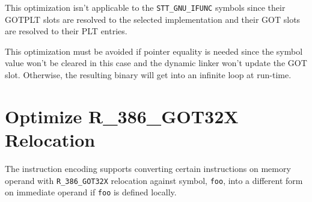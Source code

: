 This optimization isn't applicable to the \texttt{STT_GNU_IFUNC} symbols
since their GOTPLT slots are resolved to the selected implementation and
their GOT slots are resolved to their PLT entries.

This optimization must be avoided if pointer equality is needed since
the symbol value won't be cleared in this case and the dynamic linker
won't update the GOT slot.  Otherwise, the resulting binary will get
into an infinite loop at run-time.

\section{Optimize R_386_GOT32X Relocation}

The \xARCH instruction encoding supports converting certain instructions
on memory operand with \texttt{R_386_GOT32X} relocation against symbol,
\texttt{foo}, into a different form on immediate operand if \texttt{foo}
is defined locally.

